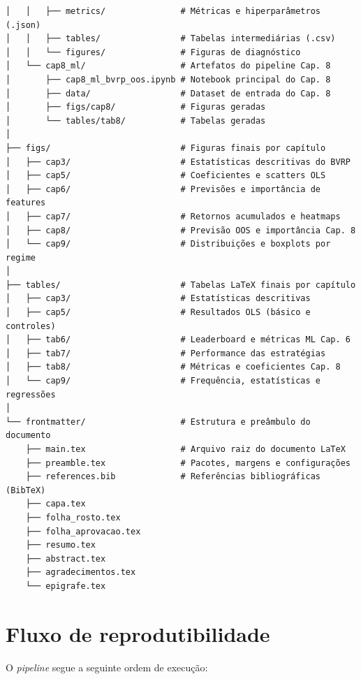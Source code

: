 \begin{verbatim}
│   │   ├── metrics/               # Métricas e hiperparâmetros (.json)
│   │   ├── tables/                # Tabelas intermediárias (.csv)
│   │   └── figures/               # Figuras de diagnóstico
│   └── cap8_ml/                   # Artefatos do pipeline Cap. 8
│       ├── cap8_ml_bvrp_oos.ipynb # Notebook principal do Cap. 8
│       ├── data/                  # Dataset de entrada do Cap. 8
│       ├── figs/cap8/             # Figuras geradas
│       └── tables/tab8/           # Tabelas geradas
│
├── figs/                          # Figuras finais por capítulo
│   ├── cap3/                      # Estatísticas descritivas do BVRP
│   ├── cap5/                      # Coeficientes e scatters OLS
│   ├── cap6/                      # Previsões e importância de features
│   ├── cap7/                      # Retornos acumulados e heatmaps
│   ├── cap8/                      # Previsão OOS e importância Cap. 8
│   └── cap9/                      # Distribuições e boxplots por regime
│
├── tables/                        # Tabelas LaTeX finais por capítulo
│   ├── cap3/                      # Estatísticas descritivas
│   ├── cap5/                      # Resultados OLS (básico e controles)
│   ├── tab6/                      # Leaderboard e métricas ML Cap. 6
│   ├── tab7/                      # Performance das estratégias
│   ├── tab8/                      # Métricas e coeficientes Cap. 8
│   └── cap9/                      # Frequência, estatísticas e regressões
│
└── frontmatter/                   # Estrutura e preâmbulo do documento
    ├── main.tex                   # Arquivo raiz do documento LaTeX
    ├── preamble.tex               # Pacotes, margens e configurações
    ├── references.bib             # Referências bibliográficas (BibTeX)
    ├── capa.tex
    ├── folha_rosto.tex
    ├── folha_aprovacao.tex
    ├── resumo.tex
    ├── abstract.tex
    ├── agradecimentos.tex
    └── epigrafe.tex
\end{verbatim}

\section{Fluxo de reprodutibilidade}

O \textit{pipeline} segue a seguinte ordem de execução:


